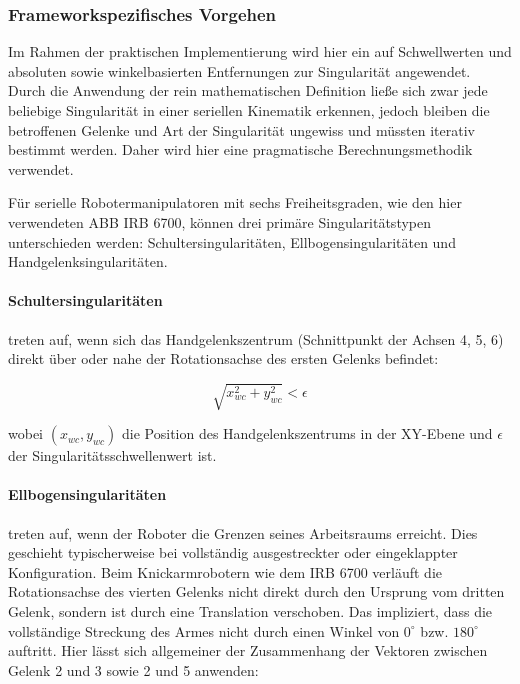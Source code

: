 \subsubsection{Frameworkspezifisches Vorgehen}
Im Rahmen der praktischen Implementierung wird hier ein auf Schwellwerten und
absoluten sowie winkelbasierten Entfernungen zur Singularität angewendet. Durch
die Anwendung der rein mathematischen Definition ließe sich zwar jede beliebige
Singularität in einer seriellen Kinematik erkennen, jedoch bleiben die
betroffenen Gelenke und Art der Singularität ungewiss und müssten iterativ
bestimmt werden. Daher wird hier eine pragmatische Berechnungsmethodik
verwendet.

Für serielle Robotermanipulatoren mit sechs Freiheitsgraden, wie den hier
verwendeten ABB IRB 6700, können drei primäre Singularitätstypen unterschieden
werden: Schultersingularitäten, Ellbogensingularitäten und
Handgelenksingularitäten.

\paragraph{Schultersingularitäten} treten auf, wenn sich das
Handgelenkszentrum (Schnittpunkt der Achsen 4, 5, 6) direkt über oder nahe der
Rotationsachse des ersten Gelenks befindet:

\begin{equation}
  \sqrt{x_{wc}^2 + y_{wc}^2} < \epsilon
  \label{eq:shoulder_singularity}
\end{equation}

wobei $(x_{wc}, y_{wc})$ die Position des Handgelenkszentrums in der XY-Ebene
und $\epsilon$ der Singularitätsschwellenwert ist.

\paragraph{Ellbogensingularitäten} treten auf, wenn der Roboter die
Grenzen seines
Arbeitsraums erreicht. Dies geschieht typischerweise bei vollständig
ausgestreckter oder eingeklappter Konfiguration. Beim
Knickarmrobotern wie dem IRB 6700
verläuft die Rotationsachse des vierten Gelenks nicht direkt durch
den Ursprung vom
dritten Gelenk, sondern ist durch eine Translation verschoben. Das impliziert,
dass die vollständige Streckung des Armes nicht durch einen Winkel
von $0^\circ$ bzw.
$180^\circ$ auftritt. Hier lässt sich allgemeiner der Zusammenhang der Vektoren
zwischen Gelenk 2 und 3 sowie 2 und 5 anwenden:

